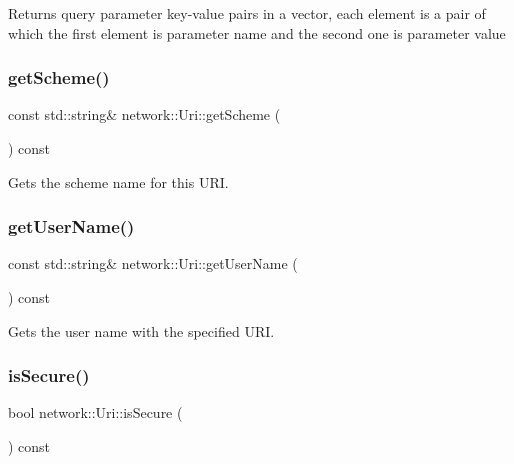 \begin{DoxyReturn}{Returns}
query parameter key-\/value pairs in a vector, each element is a pair of which the first element is parameter name and the second one is parameter value 
\end{DoxyReturn}
\mbox{\label{classnetwork_1_1Uri_a6cb9e0fbc51e0478dbd6968b0092b032}} 
\subsubsection{\texorpdfstring{get\+Scheme()}{getScheme()}}
{\footnotesize\ttfamily const std\+::string\& network\+::\+Uri\+::get\+Scheme (\begin{DoxyParamCaption}{ }\end{DoxyParamCaption}) const\hspace{0.3cm}{\ttfamily [inline]}}

Gets the scheme name for this U\+RI. \mbox{\label{classnetwork_1_1Uri_aaa484dfe8e72c3595889a9b95eaffc6c}} 
\subsubsection{\texorpdfstring{get\+User\+Name()}{getUserName()}}
{\footnotesize\ttfamily const std\+::string\& network\+::\+Uri\+::get\+User\+Name (\begin{DoxyParamCaption}{ }\end{DoxyParamCaption}) const\hspace{0.3cm}{\ttfamily [inline]}}

Gets the user name with the specified U\+RI. \mbox{\label{classnetwork_1_1Uri_ad7451b6cd34c82b84d105b10e65c7283}} 
\subsubsection{\texorpdfstring{is\+Secure()}{isSecure()}}
{\footnotesize\ttfamily bool network\+::\+Uri\+::is\+Secure (\begin{DoxyParamCaption}{ }\end{DoxyParamCaption}) const\hspace{0.3cm}{\ttfamily [inline]}}

